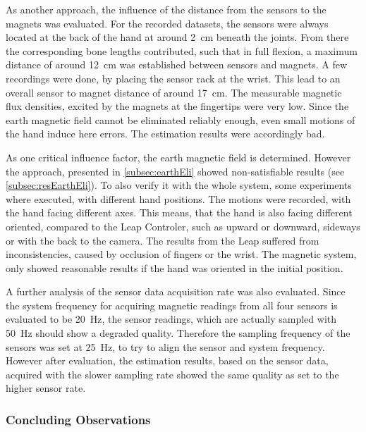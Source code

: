As another approach, the influence of the distance from the sensors to the magnets was evaluated. For the recorded datasets, the sensors were always located at the back of the hand at around \SI{2}{\cm} beneath the joints. From there the corresponding bone lengths contributed, such that in full flexion, a maximum distance of around \SI{12}{\cm} was established between sensors and magnets. A few recordings were done, by placing the sensor rack at the wrist. This lead to an overall sensor to magnet distance of around \SI{17}{\cm}. The measurable magnetic flux densities, excited by the magnets at the fingertips were very low. Since the earth magnetic field cannot be eliminated reliably enough, even small motions of the hand induce here errors. The estimation results were accordingly bad.

As one critical influence factor, the earth magnetic field is determined. However the approach, presented in \ref{subsec:earthEli} showed non-satisfiable results (see \ref{subsec:resEarthEli}). To also verify it with the whole system, some experiments where executed, with different hand positions. The motions were recorded, with the hand facing different axes. This means, that the hand is also facing different oriented, compared to the Leap Controler, such as upward or downward, sideways or with the back to the camera. The results from the Leap suffered from inconsistencies, caused by occlusion of fingers or the wrist. The magnetic system, only showed reasonable results if the hand was oriented in the initial position.

A further analysis of the sensor data acquisition rate was also evaluated. Since the system frequency for acquiring magnetic readings from all four sensors is evaluated to be \SI{20}{\Hz}, the sensor readings, which are actually sampled with \SI{50}{\Hz} should show a degraded quality. Therefore the sampling frequency of the sensors was set at \SI{25}{\Hz}, to try to align the sensor and system frequency. However after evaluation, the estimation results, based on the sensor data, acquired with the slower sampling rate showed the same quality as set to the higher sensor rate.


\subsubsection{Concluding Observations}

